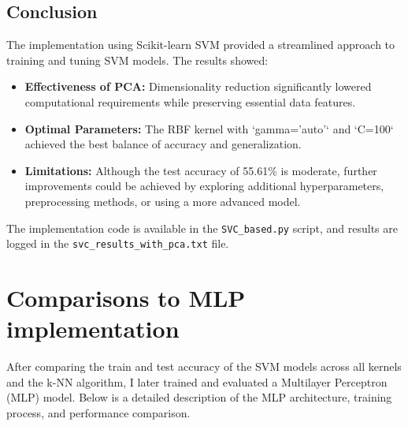 \documentclass[lettersize,journal]{IEEEtran}
\begin{document}
\subsection{\textbf{Conclusion}}
The implementation using Scikit-learn SVM provided a streamlined approach to training and tuning SVM models. The results showed:
\begin{itemize}
    \item \textbf{Effectiveness of PCA:} Dimensionality reduction significantly lowered computational requirements while preserving essential data features.
    \item \textbf{Optimal Parameters:} The RBF kernel with `gamma='auto'` and `C=100` achieved the best balance of accuracy and generalization.
    \item \textbf{Limitations:} Although the test accuracy of 55.61\% is moderate, further improvements could be achieved by exploring additional hyperparameters, preprocessing methods, or using a more advanced model.
\end{itemize}

The implementation code is available in the \texttt{SVC\_based.py} script, and results are logged in the \texttt{svc\_results\_with\_pca.txt} file.

\section{\textbf{Comparisons to MLP implementation}}

After comparing the train and test accuracy of the SVM models across all kernels and the k-NN algorithm, I later trained and evaluated a Multilayer Perceptron (MLP) model. Below is a detailed description of the MLP architecture, training process, and performance comparison.
\end{document}

